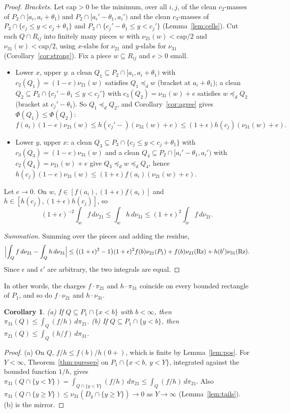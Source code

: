 \documentclass[11pt]{article}
\newtheorem{corollary}[theorem]{Corollary}
\theoremstyle{definition}\newtheorem{definition}[theorem]{Definition}
\theoremstyle{remark}\newtheorem{remark}[theorem]{Remark}
\begin{document}
\begin{proof}
\emph{Brackets.} Let $\mathrm{cap}>0$ be the minimum, over all $i,j$, of the
clean $c_2$-masses of $P_2\cap[a_i,a_i+\theta_1)$ and
$P_2\cap[a_i'-\theta_1,a_i')$ and the clean $c_3$-masses of
$P_3\cap\{c_j\le y<c_j+\theta_1\}$ and $P_3\cap\{c_j'-\theta_1\le y<c_j'\}$
(Lemma~\ref{lem:cells}). Cut each $Q\cap R_{ij}$ into finitely many pieces
$w$ with $\nu_{21}(w)<\mathrm{cap}/2$ and $\nu_{31}(w)<\mathrm{cap}/2$, using
$x$-slabs for $\nu_{21}$ and $y$-slabs for $\nu_{31}$
(Corollary~\ref{cor:strong}). Fix a piece $w\subseteq R_{ij}$ and $e>0$
small.
\begin{itemize}[leftmargin=*,itemsep=2pt]
\item Lower $x$, upper $y$: a clean $Q_1\subseteq P_2\cap[a_i,a_i+\theta_1)$
with $c_2(Q_1)=(1-e)\nu_{21}(w)$ satisfies $Q_1\preceq_dw$ (bracket at
$a_i+\theta_1$); a clean $Q_2\subseteq P_3\cap\{c_j'-\theta_1\le y<c_j'\}$
with $c_3(Q_2)=\nu_{31}(w)+e$ satisfies $w\preceq_dQ_2$ (bracket at
$c_j'-\theta_1$). So $Q_1\preceq_dQ_2$, and Corollary~\ref{cor:agree} gives
$\Phi(Q_1)\le\Phi(Q_2)$:
\[
 f(a_i)(1-e)\nu_{21}(w)\le h(c_j'-)(\nu_{31}(w)+e)\le(1+\epsilon)h(c_j)
 (\nu_{31}(w)+e).
\]
\item Lower $y$, upper $x$: a clean $Q_3\subseteq P_3\cap\{c_j\le
y<c_j+\theta_1\}$ with $c_3(Q_3)=(1-e)\nu_{31}(w)$ and a clean
$Q_4\subseteq P_2\cap[a_i'-\theta_1,a_i')$ with $c_2(Q_4)=\nu_{21}(w)+e$ give
$Q_3\preceq_dw\preceq_dQ_4$, hence
$h(c_j)(1-e)\nu_{31}(w)\le(1+\epsilon)f(a_i)(\nu_{21}(w)+e)$.
\end{itemize}
Let $e\to0$. On $w$, $f\in[f(a_i),(1+\epsilon)f(a_i)]$ and
$h\in[h(c_j),(1+\epsilon)h(c_j)]$, so
\[
 (1+\epsilon)^{-2}\int_wf\,d\nu_{21}\le\int_wh\,d\nu_{31}\le(1+\epsilon)^2
 \int_wf\,d\nu_{21}.
\]

\emph{Summation.} Summing over the pieces and adding the residue,
\[
 \Bigl|\int_Qf\,d\nu_{21}-\int_Qh\,d\nu_{31}\Bigr|\le
 \bigl((1+\epsilon)^2-1\bigr)(1+\epsilon)^2f(b)\nu_{21}(P_1)+
 f(b)\nu_{21}(\mathrm{Rz})+h(b')\nu_{31}(\mathrm{Rz}).
\]
Since $\epsilon$ and $\epsilon'$ are arbitrary, the two integrals are equal.
\end{proof}

In other words, the charges $f\cdot\pi_{21}$ and $h\cdot\pi_{31}$ coincide on
every bounded rectangle of $P_1$, and so do $f\cdot\nu_{21}$ and
$h\cdot\nu_{31}$.

\begin{corollary}\label{cor:onesidedinfty}
(a) If $Q\subseteq P_1\cap\{x<b\}$ with $b<\infty$, then
$\pi_{31}(Q)\le\int_Q(f/h)\,d\pi_{21}$. (b) If $Q\subseteq P_1\cap\{y<b\}$,
then $\pi_{21}(Q)\le\int_Q(h/f)\,d\pi_{31}$.
\end{corollary}
\begin{proof}
(a) On $Q$, $f/h\le f(b)/h(0+)$, which is finite by Lemma~\ref{lem:pos}. For
$Y<\infty$, Theorem~\ref{thm:puresep} on $P_1\cap\{x<b,\ y<Y\}$, integrated
against the bounded function $1/h$, gives
$\pi_{31}(Q\cap\{y<Y\})=\int_{Q\cap\{y<Y\}}(f/h)\,d\pi_{21}\le\int_Q(f/h)\,
d\pi_{21}$. Also $\pi_{31}(Q\cap\{y\ge Y\})\le\nu_{31}(D_y\cap\{y\ge Y\})\to0$
as $Y\to\infty$ (Lemma~\ref{lem:tails}). (b) is the mirror.
\end{proof}
\end{document}
